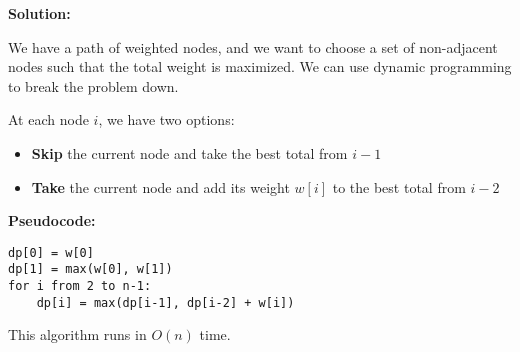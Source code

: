\documentclass[12pt]{article}
\begin{document}
\textbf{Solution:}

We have a path of weighted nodes, and we want to choose a set of non-adjacent nodes such that the total weight is maximized. We can use dynamic programming to break the problem down.

At each node $i$, we have two options:
\begin{itemize}
    \item \textbf{Skip} the current node and take the best total from $i - 1$
    \item \textbf{Take} the current node and add its weight $w[i]$ to the best total from $i - 2$
\end{itemize}

\textbf{Pseudocode:}
\begin{verbatim}
dp[0] = w[0]
dp[1] = max(w[0], w[1])
for i from 2 to n-1:
    dp[i] = max(dp[i-1], dp[i-2] + w[i])
\end{verbatim}

This algorithm runs in $O(n)$ time.
\end{document}
